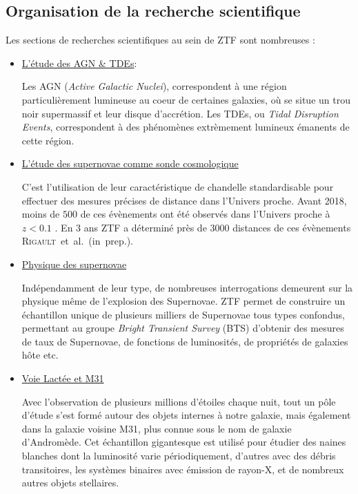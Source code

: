 \documentclass[../main/main.tex]{subfiles}
\begin{document}
\subsection{Organisation de la recherche scientifique}

Les sections de recherches scientifiques au sein de ZTF sont nombreuses \citep{GrahamZTF2019}:

\begin{itemize}[label=$\bullet$]
\setlength\itemsep{1em}
    \item \underline{L'étude des AGN \& TDEs}:
  
      Les AGN (\textit{Active Galactic Nuclei}), correspondent à une
      région particulièrement lumineuse au coeur de certaines galaxies,
      où se situe un trou noir
      supermassif et leur disque d'accrétion. Les TDEs, ou \textit{Tidal Disruption Events}, correspondent à des
      phénomènes extrèmement lumineux émanents de cette région.

    \item \underline{L'étude des supernovae comme sonde cosmologique}
      
      C'est l'utilisation de leur caractéristique de chandelle standardisable pour
      effectuer des mesures précises de distance dans l'Univers
      proche. Avant 2018, moins de $500$ de ces évènements ont
      été observés dans l'Univers proche à $z<0.1$ \citep{Scolnicpantheon21}. En 3 ans ZTF a déterminé près
      de $3000$ distances de ces évènements \mbox{\textsc{Rigault} et al. (in prep.)}.

    \item \underline{Physique des supernovae}

      Indépendamment de leur type, de nombreuses interrogations demeurent sur la
      physique même de l'explosion des Supernovae. ZTF permet de construire
      un échantillon unique de plusieurs milliers de Supernovae tous
      types confondus, permettant au groupe \textit{Bright Transient Survey}
      (BTS) d'obtenir des mesures de taux de Supernovae, de fonctions de
      luminosités, de propriétés de galaxies hôte etc.

    \item \underline{Voie Lactée et M31}

      Avec l'observation de plusieurs millions d'étoiles chaque nuit, tout un
      pôle d'étude s'est formé autour des objets internes à notre
      galaxie, mais également dans la galaxie voisine M31, plus connue
      sous le nom de galaxie d'Andromède. Cet échantillon gigantesque est utilisé pour étudier
      des naines blanches dont la luminosité varie périodiquement,
      d'autres avec des débris transitoires, les systèmes binaires avec
      émission de rayon-X, et de nombreux autres objets stellaires.



\end{itemize}
\end{document}
